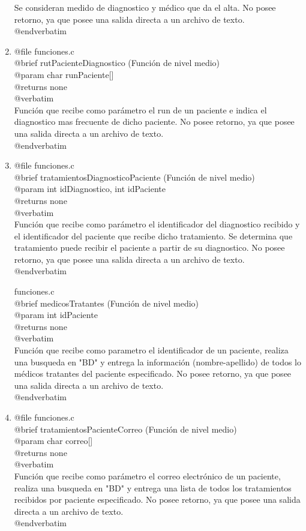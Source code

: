 \documentclass[12pt,letterpaper]{article}
\begin{document}
\begin{enumerate}
    	Se consideran medido de diagnostico y médico que da el alta.
    	No posee retorno, ya que posee una salida directa a un archivo de texto.\\
    @endverbatim 
\item @file funciones.c\\
	@brief rutPacienteDiagnostico (Función de nivel medio)\\
    @param char runPaciente[]\\
    @returns none\\
    @verbatim \\
    	Función que recibe como parámetro el run de un paciente e indica el diagnostico mas frecuente de dicho paciente.
    	No posee retorno, ya que posee una salida directa a un archivo de texto.\\
    @endverbatim
\item @file funciones.c\\
	@brief tratamientosDiagnosticoPaciente (Función de nivel medio) \\
    @param int idDiagnostico, int idPaciente\\
    @returns none\\
    @verbatim \\
    	Función que recibe como parámetro el identificador del diagnostico recibido y el identificador del paciente que recibe dicho tratamiento.
    	Se determina que tratamiento puede recibir el paciente a partir de su diagnostico. 
    	No posee retorno, ya que posee una salida directa a un archivo de texto.\\
    @endverbatim   

\item@file funciones.c\\
	@brief medicosTratantes (Función de nivel medio) \\
    @param int idPaciente\\
    @returns none\\
    @verbatim \\
    	Función que recibe como parametro el identificador de un paciente, realiza una busqueda en "BD" y entrega la información 
    	(nombre-apellido) de todos lo médicos tratantes del paciente especificado.
    	No posee retorno, ya que posee una salida directa a un archivo de texto.\\
    @endverbatim      
    
\item @file funciones.c\\
	@brief tratamientosPacienteCorreo (Función de nivel medio)\\
    @param char correo[]\\
    @returns none\\
    @verbatim \\
    	Función que recibe como parámetro el correo electrónico de un paciente, realiza una busqueda en "BD" y entrega una lista de todos los 
    	tratamientos recibidos por paciente especificado.
    	No posee retorno, ya que posee una salida directa a un archivo de texto.\\
    @endverbatim      


\end{enumerate}
\end{document}
